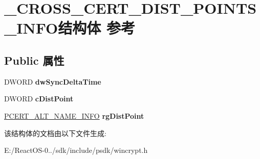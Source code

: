 \hypertarget{struct___c_r_o_s_s___c_e_r_t___d_i_s_t___p_o_i_n_t_s___i_n_f_o}{}\section{\+\_\+\+C\+R\+O\+S\+S\+\_\+\+C\+E\+R\+T\+\_\+\+D\+I\+S\+T\+\_\+\+P\+O\+I\+N\+T\+S\+\_\+\+I\+N\+F\+O结构体 参考}
\label{struct___c_r_o_s_s___c_e_r_t___d_i_s_t___p_o_i_n_t_s___i_n_f_o}
\subsection*{Public 属性}
\begin{DoxyCompactItemize}
\item 
\mbox{\label{struct___c_r_o_s_s___c_e_r_t___d_i_s_t___p_o_i_n_t_s___i_n_f_o_a7e2b8b371362c1bcca25a33f254b9e81}} 
D\+W\+O\+RD {\bfseries dw\+Sync\+Delta\+Time}
\item 
\mbox{\label{struct___c_r_o_s_s___c_e_r_t___d_i_s_t___p_o_i_n_t_s___i_n_f_o_a667ebcee7f6dbc25b19240c59470d411}} 
D\+W\+O\+RD {\bfseries c\+Dist\+Point}
\item 
\mbox{\label{struct___c_r_o_s_s___c_e_r_t___d_i_s_t___p_o_i_n_t_s___i_n_f_o_a630b2750f5f1fd11dd020cff86f2df1c}} 
\hyperlink{struct___c_e_r_t___a_l_t___n_a_m_e___i_n_f_o}{P\+C\+E\+R\+T\+\_\+\+A\+L\+T\+\_\+\+N\+A\+M\+E\+\_\+\+I\+N\+FO} {\bfseries rg\+Dist\+Point}
\end{DoxyCompactItemize}


该结构体的文档由以下文件生成\+:\begin{DoxyCompactItemize}
\item 
E\+:/\+React\+O\+S-\/0../sdk/include/psdk/wincrypt.\+h\end{DoxyCompactItemize}
